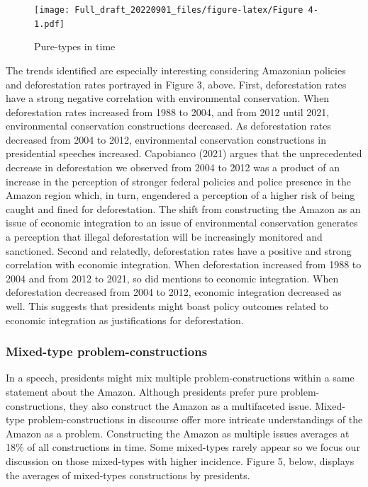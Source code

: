\documentclass[
  12pt,
]{article}
\begin{document}
\begin{figure}
\centering
\texttt{[image: Full\_draft\_20220901\_files/figure-latex/Figure 4-1.pdf]}
\caption{Pure-types in time}
\end{figure}

The trends identified are especially interesting considering Amazonian
policies and deforestation rates portrayed in Figure 3, above. First,
deforestation rates have a strong negative correlation with
environmental conservation. When deforestation rates increased from 1988
to 2004, and from 2012 until 2021, environmental conservation
constructions decreased. As deforestation rates decreased from 2004 to
2012, environmental conservation constructions in presidential speeches
increased. Capobianco (2021) argues that the unprecedented decrease in
deforestation we observed from 2004 to 2012 was a product of an increase
in the perception of stronger federal policies and police presence in
the Amazon region which, in turn, engendered a perception of a higher
risk of being caught and fined for deforestation. The shift from
constructing the Amazon as an issue of economic integration to an issue
of environmental conservation generates a perception that illegal
deforestation will be increasingly monitored and sanctioned. Second and
relatedly, deforestation rates have a positive and strong correlation
with economic integration. When deforestation increased from 1988 to
2004 and from 2012 to 2021, so did mentions to economic integration.
When deforestation decreased from 2004 to 2012, economic integration
decreased as well. This suggests that presidents might boast policy
outcomes related to economic integration as justifications for
deforestation.

\hypertarget{mixed-type-problem-constructions}{%
\subsubsection{Mixed-type
problem-constructions}\label{mixed-type-problem-constructions}}

In a speech, presidents might mix multiple problem-constructions within
a same statement about the Amazon. Although presidents prefer pure
problem-constructions, they also construct the Amazon as a multifaceted
issue. Mixed-type problem-constructions in discourse offer more
intricate understandings of the Amazon as a problem. Constructing the
Amazon as multiple issues averages at 18\% of all constructions in time.
Some mixed-types rarely appear so we focus our discussion on those
mixed-types with higher incidence. Figure 5, below, displays the
averages of mixed-types constructions by presidents.
\end{document}

